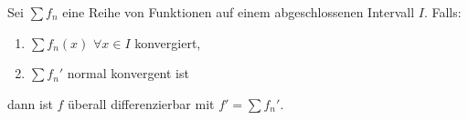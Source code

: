 \begin{theorem}\label{t:C1Konv}
  Sei $\sum f_n$ eine Reihe von Funktionen auf einem abgeschlossenen
Intervall $I$. Falls:
  \begin{enumerate}
    \item $\sum f_n (x)$ $\forall x\in I$ konvergiert,
    \item $\sum f_n'$ normal konvergent ist
  \end{enumerate}
  dann ist $f$ überall differenzierbar mit $f'=\sum f_n'$.
\end{theorem}
